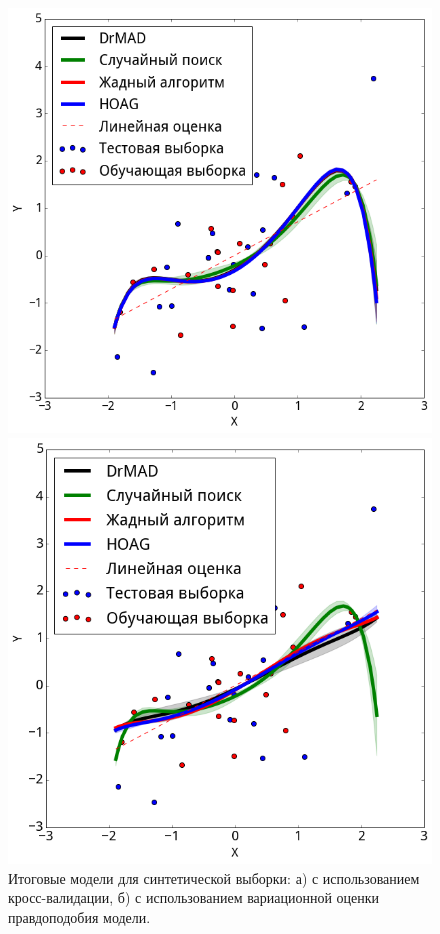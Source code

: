     \begin{figure}
     \begin{minipage}[t]{.5\textwidth}
    
    \includegraphics[width=\linewidth]{plots/hyperparams/poly_cv.png}
    \subcaption{}
    \end{minipage}
     \begin{minipage}[t]{.5\textwidth}
    \includegraphics[width=\linewidth]{plots/hyperparams/poly_var.png}
    \subcaption{}   
\end{minipage}
    
 \caption{Итоговые модели для синтетической выборки: а) с использованием кросс-валидации, б) с использованием вариационной оценки правдоподобия модели.}
  \label{fig:poly}
   
    \end{figure}




